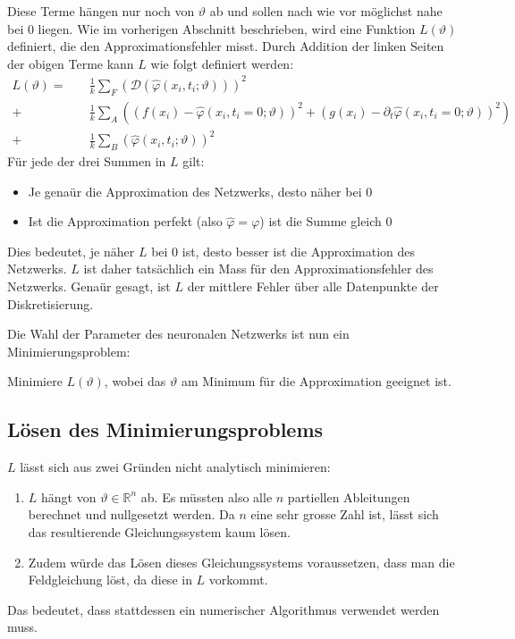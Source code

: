 Diese Terme hängen nur noch von $\vartheta$ ab und sollen nach wie vor möglichst nahe bei 0 liegen.
Wie im vorherigen Abschnitt beschrieben, wird eine Funktion $L(\vartheta)$ definiert, die den Approximationsfehler misst.
Durch Addition der linken Seiten der obigen Terme kann \( L \) wie folgt definiert werden:
\begin{equation}
    \begin{aligned}
        L(\vartheta) =\quad &\frac{1}{k} \sum_{F}^{} \left(\mathcal{D}(\hat{\varphi}(x_i, t_i; \vartheta))\right)^2\\
        + &\frac{1}{k} \sum_{A}^{} \left(\left(f(x_i) - \hat{\varphi}(x_i, t_i = 0; \vartheta)\right)^2
        + \left(g(x_i) - \partial_t \hat{\varphi}(x_i, t_i = 0; \vartheta)\right)^2\right)\\
        + &\frac{1}{k} \sum_{B}^{} \left(\hat{\varphi}(x_i, t_i; \vartheta)\right)^2
    \end{aligned}
    \label{neuronal:optimierung}
\end{equation}
Für jede der drei Summen in \( L \) gilt:
\begin{itemize}
    \item Je genaür die Approximation des Netzwerks, desto näher bei 0
    \item Ist die Approximation perfekt (also \( \hat{\varphi} = \varphi \)) ist die Summe gleich 0
\end{itemize}
Dies bedeutet, je näher \( L \) bei 0 ist, desto besser ist die Approximation des Netzwerks.
$L$ ist daher tatsächlich ein Mass für den Approximationsfehler des Netzwerks.
Genaür gesagt, ist $L$ der mittlere Fehler über alle Datenpunkte der Diskretisierung.

Die Wahl der Parameter des neuronalen Netzwerks ist nun ein Minimierungsproblem:
\begin{aufgabe}
    Minimiere $L(\vartheta)$, wobei das $\vartheta$ am Minimum für die Approximation geeignet ist.
\end{aufgabe}

\subsection{Lösen des Minimierungsproblems}\label{neuronal:subsection:lösen_optimierungsproblem}
\( L \) lässt sich aus zwei Gründen nicht analytisch minimieren:
\begin{enumerate}
    \item \( L \) hängt von \( \vartheta \in \mathbb{R}^n \) ab. 
    Es müssten also alle \( n \) partiellen Ableitungen berechnet und nullgesetzt werden. 
    Da \( n \) eine sehr grosse Zahl ist, lässt sich das resultierende Gleichungssystem kaum lösen.
    \item Zudem würde das Lösen dieses Gleichungssystems voraussetzen, dass man die Feldgleichung löst, da diese in $L$ vorkommt.
\end{enumerate}
Das bedeutet, dass stattdessen ein numerischer Algorithmus verwendet werden muss.


